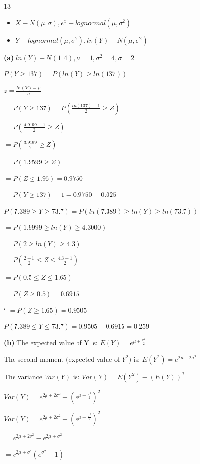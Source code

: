 \documentclass[12 pt]{article}
\begin{document}
    \begin{exercise}{13}
    \hfill

    \begin{itemize}
        \item $X - N(\mu, \sigma), e^x - lognormal(\mu, {\sigma}^2)$
        \item $Y - lognormal(\mu, {\sigma}^2), ln(Y) - N(\mu, {\sigma}^2)$
    \end{itemize}

    \textbf{(a)} $ln(Y) - N(1, 4), \mu = 1, {\sigma}^2 = 4, \sigma = 2$

    \hfill

    $P(Y \geq 137) = P(ln(Y) \geq ln(137))$

    $z = \frac{ln(Y) - \mu}{\sigma}$

    $= P(Y \geq 137) = P(\frac{ln(137) -1}{2} \geq Z)$

    $= P(\frac{4.9199 - 1}{2} \geq Z)$

    $= P(\frac{3.9199}{2} \geq Z)$

    $= P(1.9599 \geq Z)$

    $= P(Z \leq 1.96) = 0.9750$

    $= P(Y \geq 137) = 1 - 0.9750 = 0.025$

    \hfill

    $P(7.389 \geq Y\geq 73.7) = P(ln(7.389) \geq ln(Y) \geq ln(73.7))$

    $ = P(1.9999 \geq ln(Y) \geq 4.3000)$

    $= P(2 \geq ln(Y) \geq 4.3)$

    $= P(\frac{2-1}{2} \leq Z \leq \frac{4.3 -1}{2})$

    $= P(0.5 \leq Z \leq 1.65)$

    \hfill

    $= P(Z \geq 0.5) = 0.6915$

`   $= P(Z \geq 1.65) = 0.9505$

    \hfill

    $P(7.389 \leq Y \leq 73.7) = 0.9505 - 0.6915 = 0.259$

    \textbf{(b)} The expected value of Y is: $E(Y) = e^{\mu + \frac{\sigma^2}{2}}$

    \hfill

    The second moment (expected value of $Y^2$) is: $E(Y^2) = e^{2 \mu + 2 \sigma^2}$

    \hfill

    The variance $Var(Y)$ is: $Var(Y) = E(Y^2) - (E(Y))^2$

    $Var(Y) = e^{2 \mu + 2 \sigma^2} - (e^{\mu + \frac{\sigma^2}{2}})^2$

    $Var(Y) = e^{2 \mu + 2 \sigma^2} - (e^{\mu + \frac{\sigma^2}{2}})^2$

    $= e^{2 \mu + 2 \sigma^2} - e^{2 \mu + \sigma^2}$

    $= e^{2 \mu + \sigma^2}(e^{\sigma^2}-1)$

    \hfill   
    \end{exercise}
\end{document}
